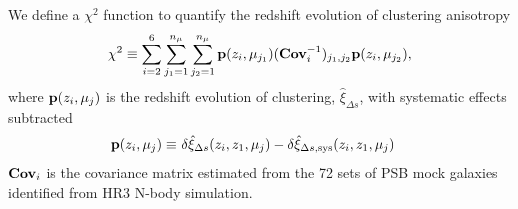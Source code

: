 \documentclass[iop]{emulateapj}
\begin{document}
We define a $\chi^2$ function to quantify the redshift evolution of clustering anisotropy
\begin{equation}\label{eq:chisq1}
\chi^2\equiv \sum_{i=2}^{6} \sum_{j_1=1}^{n_{\mu}} \sum_{j_2=1}^{n_{\mu}} {\bf p}(z_i,\mu_{j_1}) ({\bf Cov}_{i}^{-1})_{j_1,j_2}  {\bf p}(z_i,\mu_{j_2}),
\end{equation}
where ${\bf p}(z_i,\mu_{j})$ is the redshift evolution of clustering, 
$\hat \xi_{\Delta s}$, with systematic effects subtracted
\begin{eqnarray}\label{eq:bfp}
 {\bf p}(z_i,\mu_{j}) \equiv&\ \delta \hat\xi_{\Delta s}(z_i,z_1,\mu_j) - \delta \hat\xi_{\Delta s, \rm sys}(z_i,z_1,\mu_j)
\end{eqnarray}
${\bf Cov}_i$ is the covariance matrix estimated from the 72 sets of PSB mock galaxies identified from HR3 N-body simulation.





\end{document}
